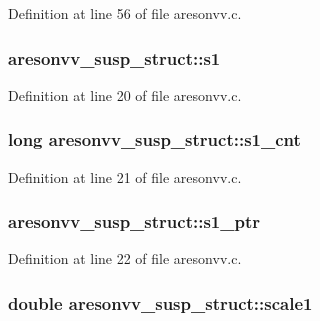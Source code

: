 Definition at line 56 of file aresonvv.\+c.

\subsubsection[{\texorpdfstring{s1}{s1}}]{ aresonvv\+\_\+susp\+\_\+struct\+::s1}\hypertarget{structaresonvv__susp__struct_a871d728d5531f7bcb5589ecba484cbbb}{}\label{structaresonvv__susp__struct_a871d728d5531f7bcb5589ecba484cbbb}


Definition at line 20 of file aresonvv.\+c.

\subsubsection[{\texorpdfstring{s1\+\_\+cnt}{s1_cnt}}]{\setlength{\rightskip}{0pt plus 5cm}long aresonvv\+\_\+susp\+\_\+struct\+::s1\+\_\+cnt}\hypertarget{structaresonvv__susp__struct_a6424dc7e059eed0ff34d0a0ad94f1f27}{}\label{structaresonvv__susp__struct_a6424dc7e059eed0ff34d0a0ad94f1f27}


Definition at line 21 of file aresonvv.\+c.

\subsubsection[{\texorpdfstring{s1\+\_\+ptr}{s1_ptr}}]{ aresonvv\+\_\+susp\+\_\+struct\+::s1\+\_\+ptr}\hypertarget{structaresonvv__susp__struct_a6eedb0b5950ff7e3b4b901af054de6f8}{}\label{structaresonvv__susp__struct_a6eedb0b5950ff7e3b4b901af054de6f8}


Definition at line 22 of file aresonvv.\+c.

\subsubsection[{\texorpdfstring{scale1}{scale1}}]{\setlength{\rightskip}{0pt plus 5cm}double aresonvv\+\_\+susp\+\_\+struct\+::scale1}\hypertarget{structaresonvv__susp__struct_a2d3ba0f59b8eb569b348f6e296b9f1c3}{}\label{structaresonvv__susp__struct_a2d3ba0f59b8eb569b348f6e296b9f1c3}


